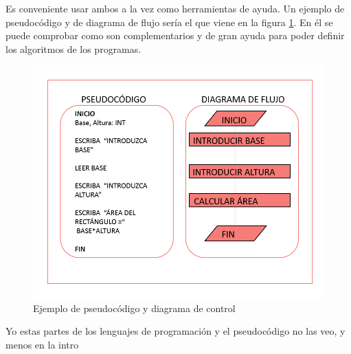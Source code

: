 \documentclass[a4paper, 12pt]{book}
\begin{document}
Es conveniente usar ambos a la vez como herramientas de ayuda. Un ejemplo de pseudocódigo y de diagrama de flujo sería el que viene en la figura \ref{figura:pseudocodigo}. En él se puede comprobar como son complementarios y de gran ayuda para poder definir los algoritmos de los programas.
\begin{figure}[h]

        \centering
        \includegraphics[scale=0.35]{img/flujo.png}
        \caption{Ejemplo de pseudocódigo y diagrama de control}
        \label{figura:pseudocodigo}
    \end{figure}

{\color{red} Yo estas partes de los lenguajes de programación y el pseudocódigo no las veo, y menos en la intro}
\end{document}
